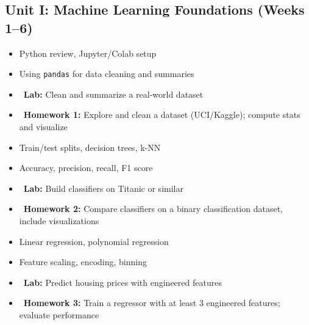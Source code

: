 \documentclass[11pt,a4paper]{article}
\begin{document}
\subsection*{\textcolor{secondary}{\faRobot} Unit I: Machine Learning Foundations (Weeks 1--6)}

\begin{weekbox}[title={Week 1: Python Fundamentals \& Data Handling}]
\begin{itemize}
  \item Python review, Jupyter/Colab setup
  \item Using \texttt{pandas} for data cleaning and summaries
  \item \textcolor{accent}{\faFlask\ \textbf{Lab:}} Clean and summarize a real-world dataset
  \item \textcolor{warning}{\faEdit\ \textbf{Homework 1:}} Explore and clean a dataset (UCI/Kaggle); compute stats and visualize
\end{itemize}
\end{weekbox}

\begin{weekbox}[title={Week 2: Supervised Learning -- Classification}]
\begin{itemize}
  \item Train/test splits, decision trees, k-NN
  \item Accuracy, precision, recall, F1 score
  \item \textcolor{accent}{\faFlask\ \textbf{Lab:}} Build classifiers on Titanic or similar
  \item \textcolor{warning}{\faEdit\ \textbf{Homework 2:}} Compare classifiers on a binary classification dataset, include visualizations
\end{itemize}
\end{weekbox}

\begin{weekbox}[title={Week 3: Regression \& Feature Engineering}]
\begin{itemize}
  \item Linear regression, polynomial regression
  \item Feature scaling, encoding, binning
  \item \textcolor{accent}{\faFlask\ \textbf{Lab:}} Predict housing prices with engineered features
  \item \textcolor{warning}{\faEdit\ \textbf{Homework 3:}} Train a regressor with at least 3 engineered features; evaluate performance
\end{itemize}
\end{weekbox}
\end{document}
